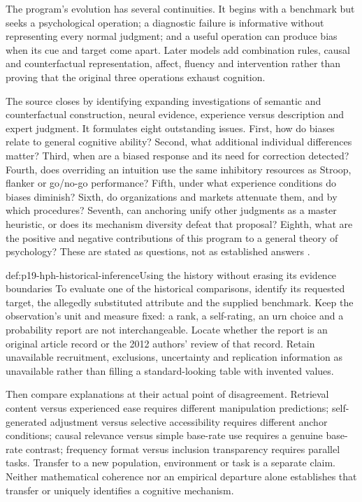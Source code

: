 The program's evolution has several continuities. It begins with a
benchmark but seeks a psychological operation; a diagnostic failure is
informative without representing every normal judgment; and a useful
operation can produce bias when its cue and target come apart. Later
models add combination rules, causal and counterfactual representation,
affect, fluency and intervention rather than proving that the original
three operations exhaust cognition.

The source closes by identifying expanding investigations of semantic
and counterfactual construction, neural evidence, experience versus
description and expert judgment. It formulates eight outstanding issues.
First, how do biases relate to general cognitive ability? Second, what
additional individual differences matter? Third, when are a biased
response and its need for correction detected? Fourth, does overriding
an intuition use the same inhibitory resources as Stroop, flanker or
go/no-go performance? Fifth, under what experience conditions do biases
diminish? Sixth, do organizations and markets attenuate them, and by
which procedures? Seventh, can anchoring unify other judgments as a
master heuristic, or does its mechanism diversity defeat that proposal?
Eighth, what are the positive and negative contributions of this program
to a general theory of psychology? These are stated as questions, not
as established answers
\cite[p.~341]{GriffinEtAl2012HeuristicsHistory}.

\begin{hbmethod}{def:p19-hph-historical-inference}{Using the history without erasing its evidence boundaries}
To evaluate one of the historical comparisons, identify its requested
target, the allegedly substituted attribute and the supplied benchmark.
Keep the observation's unit and measure fixed: a rank, a self-rating,
an urn choice and a probability report are not interchangeable.
Locate whether the report is an original article record or the 2012
authors' review of that record. Retain unavailable recruitment, exclusions,
uncertainty and replication information as unavailable rather than
filling a standard-looking table with invented values.

Then compare explanations at their actual point of disagreement.
Retrieval content versus experienced ease requires different manipulation
predictions; self-generated adjustment versus selective accessibility
requires different anchor conditions; causal relevance versus simple
base-rate use requires a genuine base-rate contrast; frequency format
versus inclusion transparency requires parallel tasks. Transfer to a
new population, environment or task is a separate claim. Neither
mathematical coherence nor an empirical departure alone establishes
that transfer or uniquely identifies a cognitive mechanism.
\end{hbmethod}

